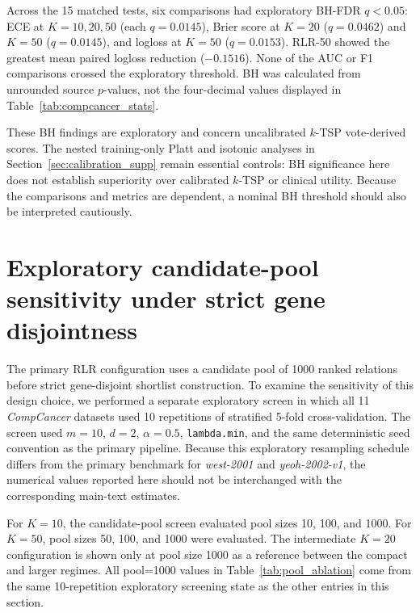 \documentclass[11pt, a4paper]{article}
\begin{document}
Across the 15 matched tests, six comparisons had exploratory BH-FDR $q<0.05$: ECE at $K=10,20,50$ (each $q=0.0145$), Brier score at $K=20$ ($q=0.0462$) and $K=50$ ($q=0.0145$), and logloss at $K=50$ ($q=0.0153$). RLR-50 showed the greatest mean paired logloss reduction ($-0.1516$). None of the AUC or F1 comparisons crossed the exploratory threshold. BH was calculated from unrounded source $p$-values, not the four-decimal values displayed in Table~\ref{tab:compcancer_stats}.

These BH findings are exploratory and concern uncalibrated $k$-TSP vote-derived scores. The nested training-only Platt and isotonic analyses in Section~\ref{sec:calibration_supp} remain essential controls: BH significance here does not establish superiority over calibrated $k$-TSP or clinical utility. Because the comparisons and metrics are dependent, a nominal BH threshold should also be interpreted cautiously.

\FloatBarrier
\section{Exploratory candidate-pool sensitivity under strict gene disjointness}

The primary RLR configuration uses a candidate pool of 1000 ranked relations before strict gene-disjoint shortlist construction. To examine the sensitivity of this design choice, we performed a separate exploratory screen in which all 11 \emph{CompCancer} datasets used 10 repetitions of stratified 5-fold cross-validation. The screen used $m=10$, $d=2$, $\alpha=0.5$, \texttt{lambda.min}, and the same deterministic seed convention as the primary pipeline. Because this exploratory resampling schedule differs from the primary benchmark for \emph{west-2001} and \emph{yeoh-2002-v1}, the numerical values reported here should not be interchanged with the corresponding main-text estimates.

For $K=10$, the candidate-pool screen evaluated pool sizes 10, 100, and 1000. For $K=50$, pool sizes 50, 100, and 1000 were evaluated. The intermediate $K=20$ configuration is shown only at pool size 1000 as a reference between the compact and larger regimes. All pool=1000 values in Table~\ref{tab:pool_ablation} come from the same 10-repetition exploratory screening state as the other entries in this section.
\end{document}
